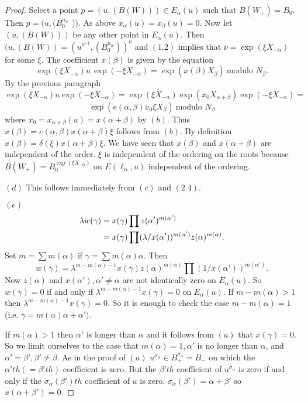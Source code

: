 \documentclass{memo-l}
\theoremstyle{definition}
\theoremstyle{remark}
\numberwithin{section}{chapter}
\numberwithin{equation}{chapter}
\begin{document}
\begin{proof}
   Select a point $p = (u,(B(W)))  \in  E_{{\alpha}}(u)$ such that
$B(W_{+}) = B_{0}$.  Then $p = (u,(B_{0}^{n_{w}}$ )).  As above
$x_{{\alpha}}(u) = x_{{\beta}}(u) = 0$.  Now let $(u,(B(W)))$ be any other
point in $E_{{\alpha}}(u)$.  Then $(u,(B(W)) = (u^{{\nu}^{-1}},
(B_{0}^{n_{w}}))^{{\nu}}$ and $(1.2)$ implies that ${\nu} =
\exp({\xi}X_{-{\alpha}})$ for some ${\xi}$.  The coefficient $x({\beta})$ is
given by the equation
$$
\exp({\xi}X_{-{\alpha}})u\,\exp(-{\xi}X_{-{\alpha}}) =
\exp(x({\beta})X_{{\beta}})\ {\text{modulo\ }} N_{{\beta}}.
$$
By the previous paragraph
$$
\exp({\xi}X_{-{\alpha}})u\exp(-{\xi}X_{-{\alpha}}) =
\exp({\xi}X_{-{\alpha}})\exp(x_{0}X_{{\alpha}+{\beta}})\exp(-{\xi}X_{-{\alpha}})
=
$$
$$
\exp(e({\alpha},{\beta})x_{0}{\xi}X_{{\beta}})\ {\text{modulo\ }} N_{{\beta}}
$$
where $x_{0} = x_{{\alpha}+{\beta}}(u) = x({\alpha}+{\beta})$ by $(b)$.
Thus $x({\beta}) = e({\alpha},{\beta})x({\alpha}+{\beta}){\xi}$ follows
from $(b)$.  By definition $x({\beta}) =
{\delta}({\xi})x({\alpha}+{\beta}){\xi}$.  We have seen that $x({\beta})$
and $x({\alpha}+{\beta})$ are independent of the order.  ${\xi}$ is
independent of the ordering on the roots because 
$B(W_{+}) = B_{0}^{\exp({\xi}X_{-{\alpha}})}$ on $E({\ell}_{{\alpha}},u)$ 
independent of the ordering.


   $(d)$ This follows immediately from $(c)$ and $(2.4)$.

   $(e)$ 
$$
\aligned
{\lambda}w({\gamma}) &= x({\gamma}) \prod z({\alpha}')^{m({\alpha}')} \\
&= x({\gamma}) \prod 
({\lambda}/x({\alpha}'))^{m({\alpha}')}z({\alpha})^{m({\alpha})} .
\endaligned
$$
Set $m = \sum m({\alpha})$ if ${\gamma} = \sum m({\alpha}){\alpha}$.
Then
$$
w({\gamma}) = {\lambda}^{m-m({\alpha})-1}
x({\gamma})z({\alpha})^{m({\alpha})} \prod 
(1/x({\alpha}'))^{m({\alpha}')} .
$$
Now $z({\alpha})$ and $x({\alpha}'), {\alpha}' \ne {\alpha}$ are not
identically zero on $E_{{\alpha}}(u)$.  So $w({\gamma}) = 0$ if and only if
${\lambda}^{m-m({\alpha})-1} x({\gamma}) = 0$ on $E_{{\alpha}}(u)$.  If
$m-m({\alpha}) > 1$ then ${\lambda}^{m-m({\alpha})-1} x({\gamma}) = 0$.
So it is enough to check the case $m-m({\alpha}) =1$ (i.e.
${\gamma} = m({\alpha}){\alpha}+{\alpha}')$.

   If $m({\alpha}) > 1$ then ${\alpha}'$ is longer than ${\alpha}$ and it
follows from $(a)$ that $x({\gamma}) = 0$.  So we limit ourselves to the case
that $m({\alpha}) = 1, {\alpha}'$ is no longer than ${\alpha}$, and
${\alpha}' = {\beta}',{\beta}' \ne {\beta}$.  As in the proof of 
$(a)$ $u^{{\sigma}_{{\alpha}}}  \in  B_{+}^{{\sigma}_{{\alpha}}}  =  B_{-}$
on which the ${\alpha}'th ( = {\beta}'th)$ coefficient is zero.  But the
${\beta}'th$ coefficient of $u^{{\sigma}_{{\alpha}}}$ is zero if and
only if the ${\sigma}_{{\alpha}}({\beta}')th$ coefficient of $u$ is zero.
${\sigma}_{{\alpha}}({\beta}') = {\alpha}+{\beta}'$ so
$x({\alpha}+{\beta}') = 0$.


\end{proof}
\end{document}
